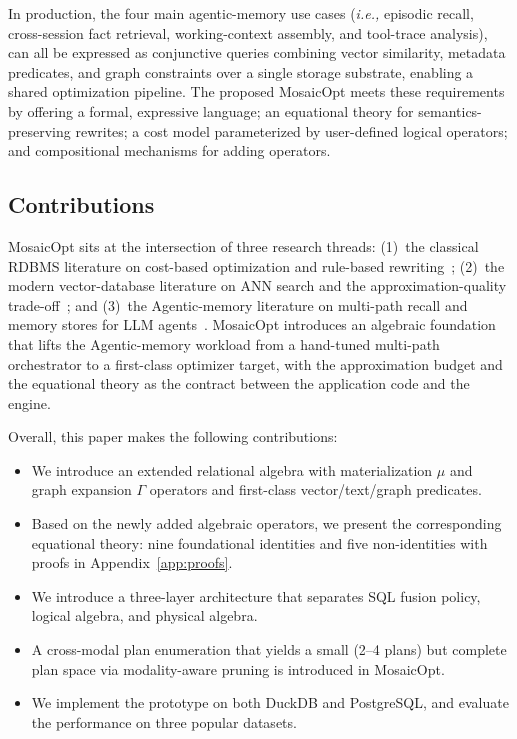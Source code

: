 \documentclass[sigconf]{acmart}
\theoremstyle{plain}
\theoremstyle{definition}
\newcommand{\ie}{\emph{i.e.,}\xspace}
\newcommand{\bcirclednumber}[1]{\ding{\numexpr181+#1\relax}}
\theoremstyle{remark}
\begin{document}
In production, the four main agentic-memory use cases (\ie episodic recall, cross-session fact retrieval, working-context assembly, and tool-trace analysis), can all be expressed as conjunctive queries combining vector similarity, metadata predicates, and graph constraints over a single storage substrate, enabling a shared optimization pipeline.
The proposed MosaicOpt meets these requirements by offering \bcirclednumber{1} a formal, expressive language; \bcirclednumber{2} an equational theory for semantics-preserving rewrites; \bcirclednumber{3} a cost model parameterized by user-defined logical operators; and \bcirclednumber{4} compositional mechanisms for adding operators. 

\subsection{Contributions}\label{sec:contrib}
MosaicOpt sits at the intersection of three research threads: (1)~the classical RDBMS literature on cost-based optimization and rule-based rewriting~\cite{selinger1979,graefe1994,graefe1995,hellerstein1995,chaudhuri1998optimization,graefe2011}; (2)~the modern vector-database literature on ANN
search and the approximation-quality trade-off~\cite{indyk1998lsh,jegou2010pq,johnson2019faiss,hnsw,pennington2014glove,mikolov2013,vaswani2017attention,subramanya2019diskann,guo2020diskann,acorn2022,sehgal2025navix,marcus2024curator,lin2024fafnir}; and (3)~the Agentic-memory literature on multi-path recall and memory stores for LLM agents~\cite{mem0,letta,yao2022react,park2023generative,packer2024memgpt}.
MosaicOpt introduces an algebraic foundation that lifts the Agentic-memory workload from a hand-tuned multi-path orchestrator to a first-class optimizer target, with the approximation budget and the equational theory as the contract between the application code and the engine.

Overall, this paper makes the following contributions:

\begin{itemize}[leftmargin=*, itemsep=0pt]
  \item We introduce an extended relational algebra with materialization $\mu$
    and graph expansion $\Gamma$ operators and first-class
    vector/text/graph predicates.
  \item Based on the newly added algebraic operators, we present the corresponding equational theory: nine foundational identities and five non-identities with proofs in
    Appendix~\ref{app:proofs}.
  \item We introduce a three-layer architecture that separates SQL fusion policy,
    logical algebra, and physical algebra.
  \item A cross-modal plan enumeration that yields a small
 (2--4 plans) but complete plan space via modality-aware pruning is introduced in MosaicOpt.
  \item We implement the prototype on both DuckDB and PostgreSQL, and evaluate the performance on three popular datasets.
\end{itemize}
\end{document}
